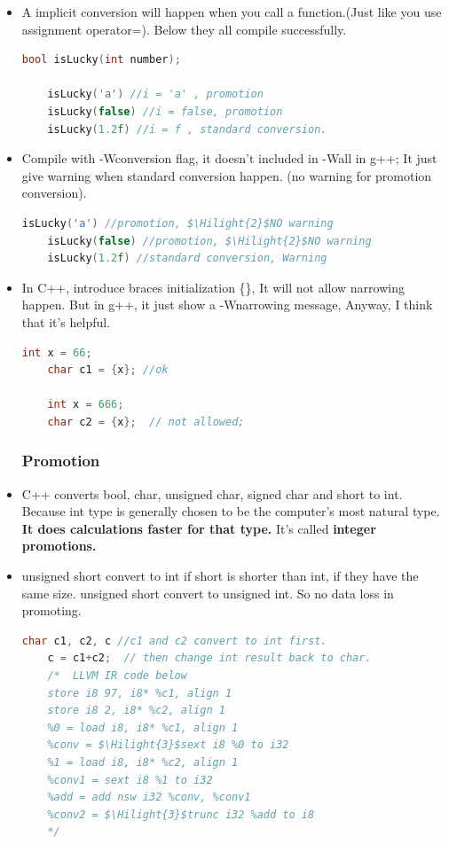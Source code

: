 \documentclass[a4paper,12pt,twoside]{book}
\newcommand{\Hilight}[1]{\makebox[0pt][l]{\color{yellow}\rule[-3pt]{#1em}{11pt}}}
\begin{document}
\begin{itemize}
\begin{lstlisting}[frame=single, language=c++]
	f = i;
	// 1) will lost precision if i is big.
	\end{lstlisting}
	
	\item A implicit conversion will happen when you call a function.(Just like you use assignment operator=). Below they all compile successfully. 
	\begin{lstlisting}[frame=single, language=c++]
	bool isLucky(int number);
	
	isLucky('a') //i = 'a' , promotion
	isLucky(false) //i = false, promotion
	isLucky(1.2f) //i = f , standard conversion.
	\end{lstlisting}
	
	\item Compile with -Wconversion flag, it doesn't included in -Wall in g++; It just give warning when standard conversion happen. (no warning for promotion conversion).
	
	\begin{lstlisting}[frame=single, language=c++, mathescape=true]
	isLucky('a') //promotion, $\Hilight{2}$NO warning
	isLucky(false) //promotion, $\Hilight{2}$NO warning
	isLucky(1.2f) //standard conversion, Warning
	\end{lstlisting}
	
	\item In C++, introduce braces initialization \{\}, It will not allow narrowing happen. But in g++, it just show a -Wnarrowing message, Anyway, I think that it's helpful.
	\begin{lstlisting}[frame=single, language=c++]
	int x = 66;
	char c1 = {x}; //ok
	
	int x = 666;
	char c2 = {x};  // not allowed;
	\end{lstlisting}
	
	\subsubsection{Promotion}
	\item C++ converts bool, char, unsigned char, signed char and short to int. Because int type is generally chosen to be the computer's most natural type. \textbf{It does calculations faster for that type.} It's called \textbf{integer promotions.}
	
	\item unsigned short convert to int if short is shorter than int, if they have the same size. unsigned short convert to unsigned int.  So no data loss in promoting.
	\begin{lstlisting}[frame=single, language=c++, mathescape=true]
	char c1, c2, c //c1 and c2 convert to int first.
	c = c1+c2;  // then change int result back to char.
	/*  LLVM IR code below
	store i8 97, i8* %c1, align 1
	store i8 2, i8* %c2, align 1
	%0 = load i8, i8* %c1, align 1
	%conv = $\Hilight{3}$sext i8 %0 to i32
	%1 = load i8, i8* %c2, align 1
	%conv1 = sext i8 %1 to i32
	%add = add nsw i32 %conv, %conv1
	%conv2 = $\Hilight{3}$trunc i32 %add to i8
	*/
	

\end{lstlisting}
\end{itemize}
\end{document}

